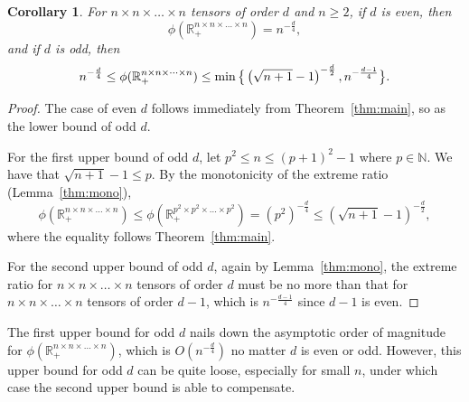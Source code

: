 \documentclass[11pt]{article}
\newtheorem{corollary}[theorem]{Corollary}
\newcommand{\R}{\mathbb{R}}
\newcommand{\N}{\mathbb{N}}
\begin{document}
\begin{corollary}\label{thm:ordernn}
  For $n\times n\times \dots \times n$ tensors of order $d$ and $n\ge2$, if $d$ is even,
  then
  $$\phi(\R_+^{n\times n\times \dots \times n})=n^{-\frac{d}{4}},$$
  and if $d$ is odd, then
  $$ n^{-\frac{d}{4}}\le  \phi(\R_+^{n\times n\times \dots \times n}) \le \min\big{\{}\left(\sqrt{n+1}-1\right)^{-\frac{d}{2}},n^{-\frac{d-1}{4}}\big{\}}.$$
\end{corollary}
\begin{proof}
The case of even $d$ follows immediately from Theorem~\ref{thm:main}, so as the lower bound of odd $d$.

For the first upper bound of odd $d$, let $p^2\le n \le (p+1)^2-1$ where $p\in\N$. We have that $\sqrt{n+1}-1\le p$. By the monotonicity of the extreme ratio (Lemma~\ref{thm:mono}),
$$
\phi(\R_+^{n\times n\times \dots \times n}) \le
\phi(\R_+^{p^2\times p^2\times \dots \times p^2}) = (p^2)^{-\frac{d}{4}} \le
\left(\sqrt{n+1}-1\right)^{-\frac{d}{2}},$$
where the equality follows Theorem~\ref{thm:main}.

For the second upper bound of odd $d$, again by Lemma~\ref{thm:mono}, the extreme ratio for $n\times n\times \dots \times n$ tensors of order $d$ must be no more than that for $n\times n\times \dots \times n$ tensors of order $d-1$, which is $n^{-\frac{d-1}{4}}$ since $d-1$ is even.
\end{proof}

The first upper bound for odd $d$ nails down the asymptotic order of magnitude for $\phi(\R_+^{n\times n\times \dots \times n})$, which is $O(n^{-\frac{d}{4}})$ no matter $d$ is even or odd. However, this upper bound for odd $d$ can be quite loose, especially for small $n$, under which case the second upper bound is able to compensate.
\end{document}
